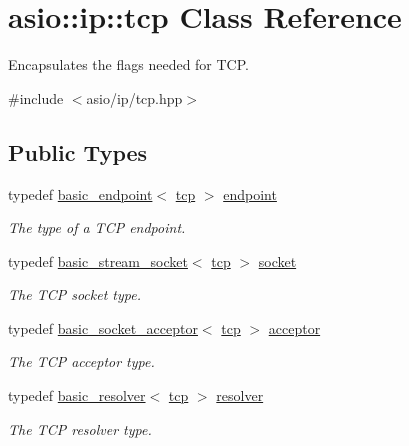 \hypertarget{classasio_1_1ip_1_1tcp}{}\section{asio\+:\+:ip\+:\+:tcp Class Reference}
\label{classasio_1_1ip_1_1tcp}


Encapsulates the flags needed for T\+C\+P.  




{\ttfamily \#include $<$asio/ip/tcp.\+hpp$>$}

\subsection*{Public Types}
\begin{DoxyCompactItemize}
\item 
typedef \hyperlink{classasio_1_1ip_1_1basic__endpoint}{basic\+\_\+endpoint}$<$ \hyperlink{classasio_1_1ip_1_1tcp}{tcp} $>$ \hyperlink{classasio_1_1ip_1_1tcp_ad8c036bc6e1ae9b77b3beca871933de2}{endpoint}
\begin{DoxyCompactList}\small\item\em The type of a T\+C\+P endpoint. \end{DoxyCompactList}\item 
typedef \hyperlink{classasio_1_1basic__stream__socket}{basic\+\_\+stream\+\_\+socket}$<$ \hyperlink{classasio_1_1ip_1_1tcp}{tcp} $>$ \hyperlink{classasio_1_1ip_1_1tcp_a6f5bf95251747bb81d75784387938d6a}{socket}
\begin{DoxyCompactList}\small\item\em The T\+C\+P socket type. \end{DoxyCompactList}\item 
typedef \hyperlink{classasio_1_1basic__socket__acceptor}{basic\+\_\+socket\+\_\+acceptor}$<$ \hyperlink{classasio_1_1ip_1_1tcp}{tcp} $>$ \hyperlink{classasio_1_1ip_1_1tcp_a09a6c28b61af7d9d7680c03ba5062f67}{acceptor}
\begin{DoxyCompactList}\small\item\em The T\+C\+P acceptor type. \end{DoxyCompactList}\item 
typedef \hyperlink{classasio_1_1ip_1_1basic__resolver}{basic\+\_\+resolver}$<$ \hyperlink{classasio_1_1ip_1_1tcp}{tcp} $>$ \hyperlink{classasio_1_1ip_1_1tcp_a5e41beb40a92f3bde7563645c2fe5f6c}{resolver}
\begin{DoxyCompactList}\small\item\em The T\+C\+P resolver type. \end{DoxyCompactList}\item 

\end{DoxyCompactItemize}
